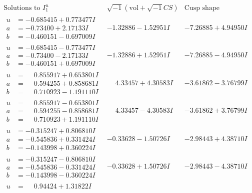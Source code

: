 \documentclass[1p]{elsarticle_modified}
\theoremstyle{definition}
\newcommand{\I}{\sqrt{-1}}
\begin{document}
$$\begin{array}{c|c|c}  
\text{Solutions to }I^u_{1}& \I (\text{vol} + \sqrt{-1}CS) & \text{Cusp shape}\\
 \hline 
\begin{aligned}
u &= -0.685415 + 0.773477 I \\
a &= -0.73400 + 2.17133 I \\
b &= -0.460151 - 0.697009 I\end{aligned}
 & -1.32886 - 1.52951 I & -7.26885 + 4.94950 I \\ \hline\begin{aligned}
u &= -0.685415 - 0.773477 I \\
a &= -0.73400 - 2.17133 I \\
b &= -0.460151 + 0.697009 I\end{aligned}
 & -1.32886 + 1.52951 I & -7.26885 - 4.94950 I \\ \hline\begin{aligned}
u &= \phantom{-}0.855917 + 0.653801 I \\
a &= \phantom{-}0.594255 + 0.858681 I \\
b &= \phantom{-}0.710923 - 1.191110 I\end{aligned}
 & \phantom{-}4.33457 + 4.30583 I & -3.61862 - 3.76799 I \\ \hline\begin{aligned}
u &= \phantom{-}0.855917 - 0.653801 I \\
a &= \phantom{-}0.594255 - 0.858681 I \\
b &= \phantom{-}0.710923 + 1.191110 I\end{aligned}
 & \phantom{-}4.33457 - 4.30583 I & -3.61862 + 3.76799 I \\ \hline\begin{aligned}
u &= -0.315247 + 0.806810 I \\
a &= -0.545836 + 0.331424 I \\
b &= -0.143998 + 0.360224 I\end{aligned}
 & -0.33628 - 1.50726 I & -2.98443 + 4.38710 I \\ \hline\begin{aligned}
u &= -0.315247 - 0.806810 I \\
a &= -0.545836 - 0.331424 I \\
b &= -0.143998 - 0.360224 I\end{aligned}
 & -0.33628 + 1.50726 I & -2.98443 - 4.38710 I \\ \hline\begin{aligned}
u &= \phantom{-}0.94424 + 1.31822 I \\

\end{aligned}
\end{array}$$
\end{document}
